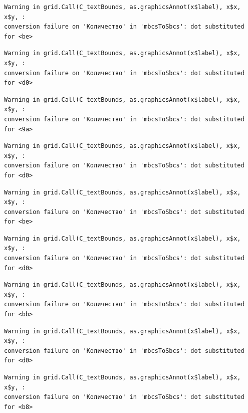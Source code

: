 \documentclass[
  letterpaper,
  DIV=11,
  numbers=noendperiod]{scrreprt}
\theoremstyle{definition}
\theoremstyle{remark}
\begin{document}
\begin{verbatim}
Warning in grid.Call(C_textBounds, as.graphicsAnnot(x$label), x$x, x$y, :
conversion failure on 'Количество' in 'mbcsToSbcs': dot substituted for <be>
\end{verbatim}

\begin{verbatim}
Warning in grid.Call(C_textBounds, as.graphicsAnnot(x$label), x$x, x$y, :
conversion failure on 'Количество' in 'mbcsToSbcs': dot substituted for <d0>
\end{verbatim}

\begin{verbatim}
Warning in grid.Call(C_textBounds, as.graphicsAnnot(x$label), x$x, x$y, :
conversion failure on 'Количество' in 'mbcsToSbcs': dot substituted for <9a>
\end{verbatim}

\begin{verbatim}
Warning in grid.Call(C_textBounds, as.graphicsAnnot(x$label), x$x, x$y, :
conversion failure on 'Количество' in 'mbcsToSbcs': dot substituted for <d0>
\end{verbatim}

\begin{verbatim}
Warning in grid.Call(C_textBounds, as.graphicsAnnot(x$label), x$x, x$y, :
conversion failure on 'Количество' in 'mbcsToSbcs': dot substituted for <be>
\end{verbatim}

\begin{verbatim}
Warning in grid.Call(C_textBounds, as.graphicsAnnot(x$label), x$x, x$y, :
conversion failure on 'Количество' in 'mbcsToSbcs': dot substituted for <d0>
\end{verbatim}

\begin{verbatim}
Warning in grid.Call(C_textBounds, as.graphicsAnnot(x$label), x$x, x$y, :
conversion failure on 'Количество' in 'mbcsToSbcs': dot substituted for <bb>
\end{verbatim}

\begin{verbatim}
Warning in grid.Call(C_textBounds, as.graphicsAnnot(x$label), x$x, x$y, :
conversion failure on 'Количество' in 'mbcsToSbcs': dot substituted for <d0>
\end{verbatim}

\begin{verbatim}
Warning in grid.Call(C_textBounds, as.graphicsAnnot(x$label), x$x, x$y, :
conversion failure on 'Количество' in 'mbcsToSbcs': dot substituted for <b8>
\end{verbatim}
\end{document}
